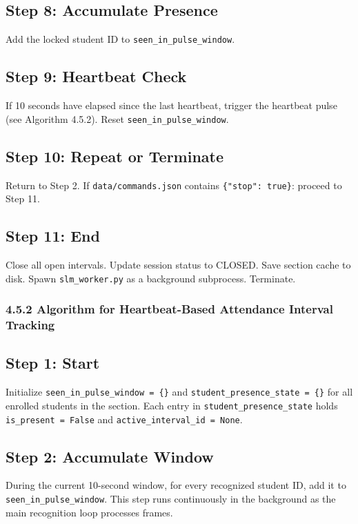 \documentclass{report}
\begin{document}
\subsection*{Step 8: Accumulate Presence}
Add the locked student ID to \texttt{seen\_in\_pulse\_window}.

\subsection*{Step 9: Heartbeat Check}
If 10 seconds have elapsed since the last heartbeat, trigger the heartbeat pulse (see Algorithm 4.5.2).\vspace{3pt} Reset \texttt{seen\_in\_pulse\_window}.

\subsection*{Step 10: Repeat or Terminate}
Return to Step 2. If \texttt{data/commands.json} contains \texttt{\{"stop": true\}}: proceed to Step 11.

\subsection*{Step 11: End}
Close all open intervals. Update session status to CLOSED. Save section cache to disk.\vspace{3pt} Spawn \texttt{slm\_worker.py} as a background subprocess. Terminate.

\subsubsection*{4.5.2 Algorithm for Heartbeat-Based Attendance Interval Tracking}

\subsection*{Step 1: Start}
Initialize \texttt{seen\_in\_pulse\_window = \{\}} and \texttt{student\_presence\_state = \{\}} for all\vspace{3pt} enrolled students in the section. Each entry in \texttt{student\_presence\_state} holds\vspace{3pt} \texttt{is\_present = False} and \texttt{active\_interval\_id = None}.

\subsection*{Step 2: Accumulate Window}
During the current 10-second window, for every recognized student ID, add it to\vspace{3pt} \texttt{seen\_in\_pulse\_window}. This step runs continuously in the background as the main recognition\vspace{3pt} loop processes frames.
\end{document}
